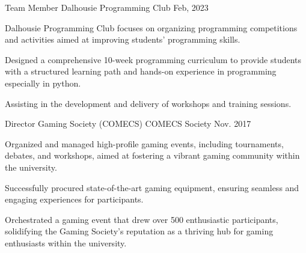 

\begin{cventries}



  \cventry
  {Team Member} %
  {Dalhousie Programming Club} %
  {} %
  {Feb, 2023} %
  {
    \begin{cvitems} %
      \item {Dalhousie Programming Club focuses on organizing programming competitions and activities aimed at improving students' programming skills.}
      \item {Designed a comprehensive 10-week programming curriculum to provide students with a structured learning path and hands-on experience in programming especially in python.}
      \item {Assisting in the development and delivery of workshops and training sessions.}
    \end{cvitems}
  }
  \cventry
    {Director Gaming Society (COMECS)} %
    {COMECS Society} %
    {} %
    {Nov. 2017} %
    {
      \begin{cvitems} %
        \item {Organized and managed high-profile gaming events, including tournaments, debates, and workshops, aimed at fostering a vibrant gaming community within the university.}
        \item {Successfully procured state-of-the-art gaming equipment, ensuring seamless and engaging experiences for participants.}
        \item {Orchestrated a gaming event that drew over 500 enthusiastic participants, solidifying the Gaming Society's reputation as a thriving hub for gaming enthusiasts within the university.}
      \end{cvitems}
    }




\end{cventries}
